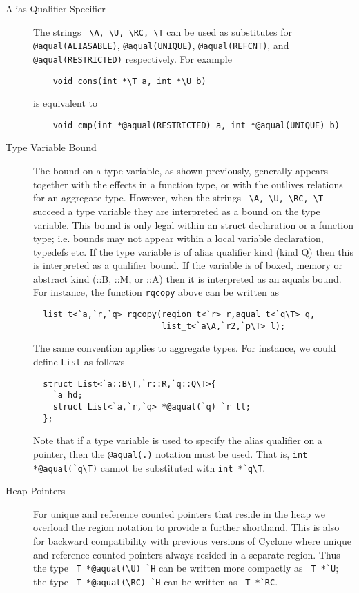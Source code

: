 \begin{description}
\item[Alias Qualifier Specifier] The strings \verb+ \A, \U, \RC, \T+
  can be used as substitutes for \verb+@aqual(ALIASABLE)+,
  \verb+@aqual(UNIQUE)+, \verb+@aqual(REFCNT)+, and
  \verb+@aqual(RESTRICTED)+ respectively. For example
  \begin{verbatim}
    void cons(int *\T a, int *\U b)
  \end{verbatim} 
  is equivalent to 
  \begin{verbatim}
    void cmp(int *@aqual(RESTRICTED) a, int *@aqual(UNIQUE) b)
  \end{verbatim}

  
\item[Type Variable Bound] The bound on a type variable, as shown
  previously, generally appears together with the effects in a
  function type, or with the outlives relations for an aggregate
  type. However, when the strings \verb+ \A, \U, \RC, \T+ succeed a
  type variable they are interpreted as a bound on the type
  variable. This bound is only legal within an struct declaration or a
  function type; i.e. bounds may not appear within a local variable
  declaration, typedefs etc. If the type variable is of alias
  qualifier kind (kind Q) then this is interpreted as a qualifier
  bound. If the variable is of boxed, memory or abstract kind (::B,
  ::M, or ::A) then it is interpreted as an aquals bound. For
  instance, the function {\tt rqcopy} above can be written as
  
  \begin{verbatim}
  list_t<`a,`r,`q> rqcopy(region_t<`r> r,aqual_t<`q\T> q,
                          list_t<`a\A,`r2,`p\T> l);
  \end{verbatim}
  
  The same convention applies to aggregate types. For instance, we
  could define {\tt List} as follows

  \begin{verbatim}
  struct List<`a::B\T,`r::R,`q::Q\T>{ 
    `a hd; 
    struct List<`a,`r,`q> *@aqual(`q) `r tl;
  };
  \end{verbatim}

  Note that if a type variable is used to specify the alias qualifier
  on a pointer, then the \texttt{@aqual(.)} notation must be
  used. That is, \verb+int *@aqual(`q\T)+ cannot be substituted with
  \verb+int *`q\T+.

\item[Heap Pointers] For unique and reference counted pointers that
  reside in the heap we overload the region notation to provide a
  further shorthand. This is also for backward compatibility with
  previous versions of Cyclone where unique and reference counted
  pointers always resided in a separate region. Thus the type
  \verb+ T *@aqual(\U) `H+ can be written more compactly as
  \verb+ T *`U+; the type \verb+ T *@aqual(\RC) `H+ can be written as
  \verb+ T *`RC+.

\end{description}

